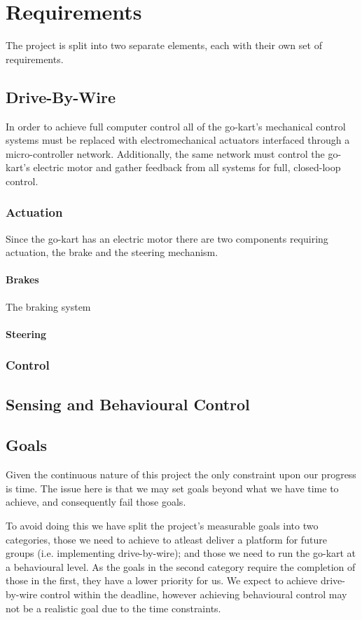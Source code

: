\chapter{Requirements}
The project is split into two separate elements, each with their own set of requirements.
\section{Drive-By-Wire}
In order to achieve full computer control all of the go-kart's mechanical control systems must be replaced with electromechanical actuators interfaced through a micro-controller network. Additionally, the same network must control the go-kart's electric motor and gather feedback from all systems for full, closed-loop control.

\subsection{Actuation}
Since the go-kart has an electric motor there are two components requiring actuation, the brake and the steering mechanism.

\subsubsection{Brakes}
The braking system 

\subsubsection{Steering}

\subsection{Control}

\section{Sensing and Behavioural Control}

\section{Goals}
Given the continuous nature of this project the only constraint upon our progress is time. The issue here is that we may set goals beyond what we have time to achieve, and consequently fail those goals.

To avoid doing this we have split the project's measurable goals into two categories, those we need to achieve to atleast deliver a platform for future groups (i.e. implementing drive-by-wire); and those we need to run the go-kart at a behavioural level. As the goals in the second category require the completion of those in the first, they have a lower priority for us. We expect to achieve drive-by-wire control within the deadline, however achieving behavioural control may not be a realistic goal due to the time constraints.

